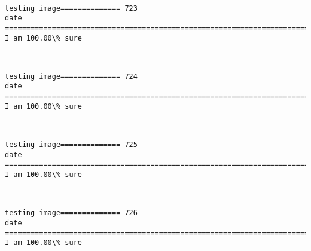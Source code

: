\documentclass[11pt]{article}
\begin{document}
    \begin{center}
    \end{center}
    { \hspace*{\fill} \\}
    
    \begin{Verbatim}[commandchars=\\\{\}]
testing image============== 723
date
============================================================================
I am 100.00\% sure

    \end{Verbatim}

    \begin{center}
    \end{center}
    { \hspace*{\fill} \\}
    
    \begin{Verbatim}[commandchars=\\\{\}]
testing image============== 724
date
============================================================================
I am 100.00\% sure

    \end{Verbatim}

    \begin{center}
    \end{center}
    { \hspace*{\fill} \\}
    
    \begin{Verbatim}[commandchars=\\\{\}]
testing image============== 725
date
============================================================================
I am 100.00\% sure

    \end{Verbatim}

    \begin{center}
    \end{center}
    { \hspace*{\fill} \\}
    
    \begin{Verbatim}[commandchars=\\\{\}]
testing image============== 726
date
============================================================================
I am 100.00\% sure

    \end{Verbatim}
\end{document}
